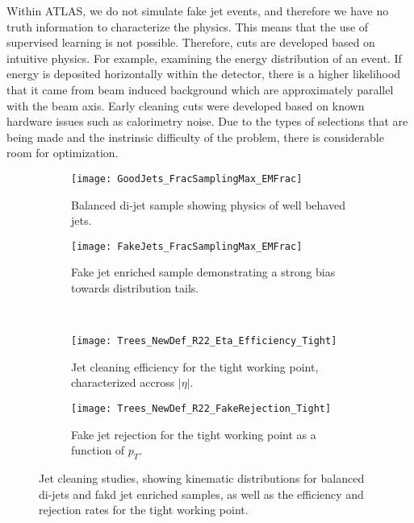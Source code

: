 \documentclass[12pt]{article}
\begin{document}
Within ATLAS, we do not simulate fake jet events, and therefore we have no truth
information to characterize the physics. This means that the use of supervised
learning is not possible. Therefore, cuts are developed based on intuitive
physics. For example, examining the energy distribution of an event. If energy
is deposited horizontally within the detector, there is a higher likelihood that
it came from beam induced background which are approximately parallel with the
beam axis. Early cleaning cuts were developed based on known hardware issues
such as calorimetry noise. Due to the types of selections that are being made
and the instrinsic difficulty of the problem, there is considerable room for
optimization. 

\begin{figure}[t!]
    \centering
    \begin{subfigure}[t]{.48\textwidth}
        \centering
        \texttt{[image: GoodJets\_FracSamplingMax\_EMFrac]}
        \caption{Balanced di-jet sample showing physics of well behaved jets.}
        \label{subfig:good_jets_th2}
    \end{subfigure}
    \hfill
    \begin{subfigure}[t]{.48\textwidth}
        \centering
        \texttt{[image: FakeJets\_FracSamplingMax\_EMFrac]}
        \caption{Fake jet enriched sample demonstrating a strong bias towards
        distribution tails.}
        \label{subfig:fake_jets_th2}
    \end{subfigure} %
    ~
    \begin{subfigure}[t]{.48\textwidth}
        \centering
        \texttt{[image: Trees\_NewDef\_R22\_Eta\_Efficiency\_Tight]}
        \caption{Jet cleaning efficiency for the tight working point,
        characterized accross $|\eta|$.}
        \label{subfig:cleaning_perf_th2_loose}
    \end{subfigure}
    \hfill
    \begin{subfigure}[t]{.48\textwidth}
        \centering
        \texttt{[image: Trees\_NewDef\_R22\_FakeRejection\_Tight]}
        \caption{Fake jet rejection for the tight working point as a function of
        $p_T$.}
        \label{subfig:cleaning_perf_th2_tight}
    \end{subfigure}
\caption{Jet cleaning studies, showing kinematic distributions for balanced
di-jets and fakd jet enriched samples, as well as the efficiency and rejection
rates for the tight working point.}
\label{fig:jet_cleaning}
\end{figure}
\end{document}
